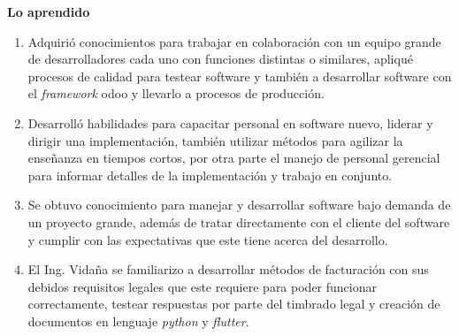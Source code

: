 \documentclass[protocolo.tex]{subfiles}
\begin{document}
\textbf{Lo aprendido}
\begin{enumerate}
\item Adquirió conocimientos para trabajar en colaboración con un equipo grande de desarrolladores cada uno
con funciones distintas o similares, apliqué procesos de calidad para testear software y
también a desarrollar software con el \textit{framework} odoo y llevarlo a procesos de producción.


\item Desarrolló habilidades para capacitar personal en software nuevo, liderar y dirigir una
implementación, también utilizar métodos para agilizar la enseñanza en tiempos cortos, por
otra parte el manejo de personal gerencial para informar detalles de la implementación y
trabajo en conjunto.


\item Se obtuvo conocimiento para manejar y desarrollar software bajo demanda de un proyecto grande,
además de tratar directamente con el cliente del software y cumplir con las expectativas que
este tiene acerca del desarrollo.

\item El Ing. Vidaña se familiarizo a desarrollar métodos de facturación con sus debidos requisitos legales que este
requiere para poder funcionar correctamente, testear respuestas por parte del timbrado legal
y creación de documentos en lenguaje \textit{python} y \textit{flutter}.

\end{enumerate}
\end{document}
